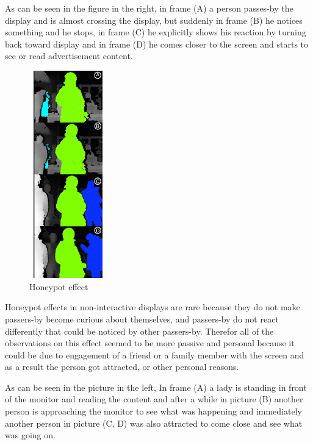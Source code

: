 As can be seen in the figure in the right, in frame (A) a person passes-by the display and is almost crossing the display, but suddenly in frame (B) he notices something and he stops, in frame (C) he explicitly shows his reaction by turning back toward display and in frame (D) he comes closer to the screen and starts to see or read advertisement content. \\


\begin{figure}
  \vspace{-20pt}
  \begin{center}
    \includegraphics[width=0.30\textwidth,height=90mm]{figures/8/non_inter_findings/effects/honeypot}
  \end{center}
  \vspace{-20pt}
  \caption{Honeypot effect}
  \vspace{-60pt}
\end{figure}
Honeypot\cite{LookingGlass} effects in non-interactive displays are rare because they do not make passers-by become curious about themselves, and passers-by do not react differently that could be noticed by other passers-by. Therefor all of the observations on this effect seemed to be more passive and personal because it could be due to engagement of a friend or a family member with the screen and as a result the person got attracted, or other personal reasons.

As can be seen in the picture in the left, In frame (A) a lady is standing in front of the monitor and reading the content and after a while in picture (B) another person is approaching the monitor to see what was happening and immediately another person in picture (C, D) was also attracted to come close and see what was going on. 


